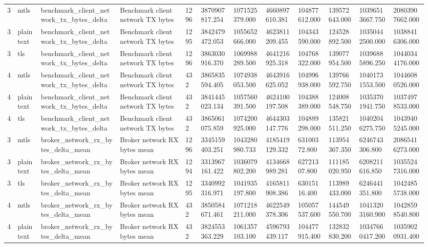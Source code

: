 \begin{longtable}{llllllllllll}
3 & mtls & benchmark\_client\_network\_tx\_bytes\_delta & Benchmark client network TX bytes & 1296 & 3870907817.254 & 1071525379.000 & 4660897610.381 & 104877612.000 & 139572643.000 & 10396513667.750 & 20803907662.000 \\
3 & plaintext & benchmark\_client\_network\_tx\_bytes\_delta & Benchmark client network TX bytes & 1295 & 3842479472.053 & 1055652666.000 & 4623811209.455 & 104343590.000 & 124528892.500 & 10350442500.000 & 10388416306.000 \\
3 & tls & benchmark\_client\_network\_tx\_bytes\_delta & Benchmark client network TX bytes & 1296 & 3863030916.370 & 1069988289.500 & 4641216925.318 & 104768322.000 & 139077954.500 & 10396885896.250 & 10440344176.000 \\
4 & mtls & benchmark\_client\_network\_tx\_bytes\_delta & Benchmark client network TX bytes & 432 & 3865835594.405 & 1074938053.500 & 4643916625.052 & 104996938.000 & 139766592.750 & 10401731553.500 & 10446080526.000 \\
4 & plaintext & benchmark\_client\_network\_tx\_bytes\_delta & Benchmark client network TX bytes & 432 & 3841445023.134 & 1057560391.500 & 4624100197.508 & 104388389.000 & 124008548.750 & 10353701941.750 & 10374978533.000 \\
4 & tls & benchmark\_client\_network\_tx\_bytes\_delta & Benchmark client network TX bytes & 432 & 3865061075.859 & 1074200925.000 & 4644303147.776 & 104889298.000 & 135821511.250 & 10402046275.750 & 10439405245.000 \\
3 & mtls & broker\_network\_rx\_bytes\_delta\_mean & Broker network RX bytes mean & 1296 & 3345159403.251 & 1043280980.733 & 4185419129.332 & 63100372.800 & 113954367.350 & 6246743306.800 & 20865416273.000 \\
3 & plaintext & broker\_network\_rx\_bytes\_delta\_mean & Broker network RX bytes mean & 1294 & 3313967161.422 & 1036079802.200 & 4134668989.281 & 62721307.800 & 111185020.950 & 6208211616.850 & 10355247316.000 \\
3 & tls & broker\_network\_rx\_bytes\_delta\_mean & Broker network RX bytes mean & 1295 & 3340992316.971 & 1041935197.800 & 4165811908.386 & 63015116.400 & 113989433.000 & 6246441351.800 & 10424855738.000 \\
4 & mtls & broker\_network\_rx\_bytes\_delta\_mean & Broker network RX bytes mean & 432 & 3850584671.461 & 1071218211.000 & 4622549378.306 & 105057537.600 & 144549550.700 & 10413203160.900 & 10428598540.800 \\
4 & plaintext & broker\_network\_rx\_bytes\_delta\_mean & Broker network RX bytes mean & 432 & 3824553363.229 & 1061357103.100 & 4596793439.117 & 104477915.400 & 132832830.200 & 10347660417.200 & 10359020931.400 \\

\end{longtable}
